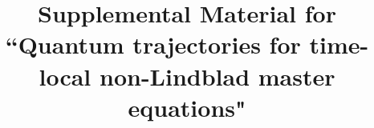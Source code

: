 \documentclass[twocolumn,prl,superscriptaddress]{revtex4-2}
\makeatletter
\def\maketitle{
	\@author@finish
	\title@column\titleblock@produce
	\suppressfloats[t]}
\makeatother
\begin{document}
\clearpage

\title{Supplemental Material for\\``Quantum trajectories for time-local non-Lindblad master equations"}
\maketitle

\setcounter{equation}{0}
\makeatletter
\renewcommand{\theequation}{A\arabic{equation}}

\onecolumngrid
\end{document}
